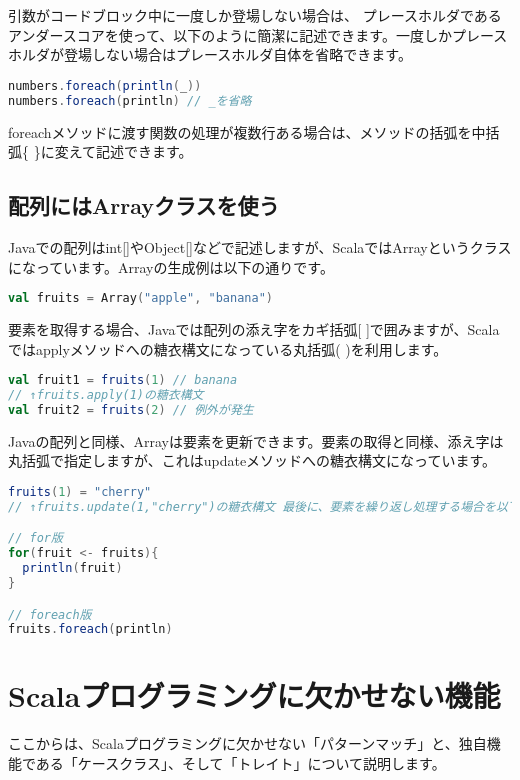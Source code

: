 引数がコードブロック中に一度しか登場しない場合は、 プレースホルダであるアンダースコアを使って、以下のように簡潔に記述できます。一度しかプレースホルダが登場しない場合はプレースホルダ自体を省略できます。

\begin{lstlisting}[language=scala, frame=none]
numbers.foreach(println(_))
numbers.foreach(println) // _を省略
\end{lstlisting}

foreachメソッドに渡す関数の処理が複数行ある場合は、メソッドの括弧を中括弧\{ \}に変えて記述できます。
\subsection{配列にはArrayクラスを使う}
Javaでの配列はint[]やObject[]などで記述しますが、ScalaではArrayというクラスになっています。Arrayの生成例は以下の通りです。

\begin{lstlisting}[language=scala, frame=none]
val fruits = Array("apple", "banana")
\end{lstlisting}

要素を取得する場合、Javaでは配列の添え字をカギ括弧[ ]で囲みますが、Scalaではapplyメソッドへの糖衣構文になっている丸括弧( )を利用します。

\begin{lstlisting}[language=scala, frame=none]
val fruit1 = fruits(1) // banana
// ↑fruits.apply(1)の糖衣構文
val fruit2 = fruits(2) // 例外が発生
\end{lstlisting}

Javaの配列と同様、Arrayは要素を更新できます。要素の取得と同様、添え字は丸括弧で指定しますが、これはupdateメソッドへの糖衣構文になっています。

\begin{lstlisting}[language=scala, frame=none]
fruits(1) = "cherry"
// ↑fruits.update(1,"cherry")の糖衣構文 最後に、要素を繰り返し処理する場合を以下に示します。

// for版
for(fruit <- fruits){
  println(fruit)
}

// foreach版
fruits.foreach(println)
\end{lstlisting}

\section{Scalaプログラミングに欠かせない機能}
ここからは、Scalaプログラミングに欠かせない「パターンマッチ」と、独自機能である「ケースクラス」、そして「トレイト」について説明します。

